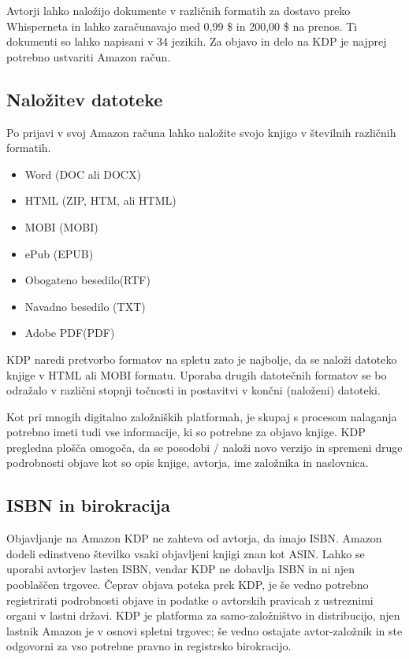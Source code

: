 \documentclass[a4paper, 12pt]{book}
\begin{document}
Avtorji lahko naložijo dokumente v različnih formatih za dostavo preko Whisperneta in lahko zaračunavajo med 0,99 \$ in 200,00 \$ na prenos. \cite{44} Ti dokumenti so lahko napisani v 34 jezikih. \cite{45} Za objavo in delo na KDP je najprej potrebno ustvariti Amazon račun.

\subsection{Naložitev datoteke}
Po prijavi v svoj Amazon računa lahko naložite svojo knjigo v številnih različnih formatih. 
\begin{itemize}
	\item Word (DOC ali DOCX)
	\item HTML (ZIP, HTM, ali HTML)
	\item MOBI (MOBI)
	\item ePub (EPUB)
	\item Obogateno besedilo(RTF)
	\item Navadno besedilo (TXT)
	\item Adobe PDF(PDF)
\end{itemize}
KDP naredi pretvorbo formatov na spletu zato je najbolje, da se naloži datoteko knjige v HTML ali MOBI formatu. Uporaba drugih datotečnih formatov se bo odražalo v različni stopnji točnosti in postavitvi v končni (naloženi) datoteki.

Kot pri mnogih digitalno založniških platformah, je skupaj s procesom nalaganja potrebno imeti tudi vse informacije, ki so potrebne za objavo knjige. KDP pregledna plošča omogoča, da se posodobi / naloži novo verzijo in spremeni druge podrobnosti objave kot so opis knjige, avtorja, ime založnika in naslovnica.

\subsection{ISBN in birokracija}
Objavljanje na Amazon KDP ne zahteva od avtorja, da imajo ISBN. Amazon dodeli edinstveno številko vsaki objavljeni knjigi znan kot ASIN. Lahko se uporabi avtorjev lasten ISBN, vendar KDP ne dobavlja ISBN in ni njen pooblaščen trgovec. Čeprav objava poteka prek KDP, je še vedno potrebno registrirati podrobnosti objave in podatke o avtorskih pravicah z ustreznimi organi v lastni državi. KDP je platforma za samo-založništvo in distribucijo, njen lastnik Amazon je v osnovi spletni trgovec; še vedno ostajate avtor-založnik in ste odgovorni za vso potrebne pravno in registrsko birokracijo.
\end{document}
